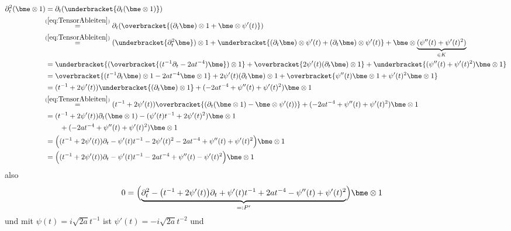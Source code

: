 \begin{align*}
\partial_t^2(\bme\otimes 1)
  &=\partial_t(\underbracket{\partial_t(\bme\otimes 1)})
\\&\!\!\overset{(\ref{eq:TensorAbleiten})}{=}
    \partial_t(\overbracket{(\partial_t\bme)\otimes 1
    + \bme\otimes \psi'(t)})
\\&\!\!\overset{(\ref{eq:TensorAbleiten})}{=}
    (\underbracket{\partial_t^2 \bme})\otimes 1
    + \underbracket{(\partial_t \bme)\otimes \psi'(t)
    +               (\partial_t \bme)\otimes \psi'(t)}
    + \bme\otimes\underset{\in K}{\underbrace{(\psi''(t) + \psi'(t)^2)}}
\\&= \underbracket{(\overbracket{(t^{-1}\partial_t - 2at^{-4}) \bme})\otimes 1}
    + \overbracket{2\psi'(t) (\partial_t \bme)\otimes 1}
    + \underbracket{(\psi''(t) + \psi'(t)^2)\bme\otimes 1}
\\&= \overbracket{ (t^{-1}\partial_t \bme)\otimes 1 - 2at^{-4} \bme\otimes 1 }
    + 2\psi'(t) (\partial_t \bme)\otimes 1 + \overbracket{
      \psi''(t) \bme\otimes 1 + \psi'(t)^2 \bme\otimes 1
    }
\\&= (t^{-1} + 2\psi'(t)) \underbracket{(\partial_t \bme)\otimes 1}
    + (- 2at^{-4} + \psi''(t) + \psi'(t)^2) \bme\otimes 1
\\&\!\!\overset{(\ref{eq:TensorAbleiten})}{=}
    (t^{-1} + 2\psi'(t))\overbracket{(\partial_t (\bme\otimes 1)
    - \bme\otimes \psi'(t))}+ (- 2at^{-4} + \psi''(t) + \psi'(t)^2)
    \bme\otimes 1
\\&\begin{aligned}
    &= (t^{-1} + 2\psi'(t))\partial_t (\bme\otimes 1)
    - (\psi'(t) t^{-1} + 2\psi'(t)^2)\bme\otimes 1\\
    &\qquad + (- 2at^{-4} + \psi''(t) + \psi'(t)^2) \bme\otimes 1 \\
  \end{aligned}
\\&= \Big((t^{-1} + 2\psi'(t))\partial_t - \psi'(t) t^{-1} - 2\psi'(t)^2
    - 2at^{-4} + \psi''(t) + \psi'(t)^2\Big) \bme\otimes 1
\\&= \Big((t^{-1} + 2\psi'(t))\partial_t - \psi'(t) t^{-1} - 2at^{-4}
    + \psi''(t) - \psi'(t)^2\Big) \bme\otimes 1
\end{align*}
also
\begin{align*}
0 &= \Big( \underset{=:P'}{\underbrace{
    \partial_t^2 - \big(t^{-1} + 2\psi'(t)\big)\partial_t
    + \psi'(t) t^{-1} + 2at^{-4} -\psi''(t)
    + \psi'(t)^2 }} \Big) \bme\otimes 1
\end{align*}
und mit $\psi(t)=i\sqrt{2a}t^{-1}$ ist $\psi'(t)=-i\sqrt{2a}t^{-2}$ und
